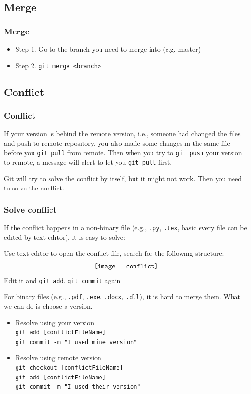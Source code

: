\documentclass{beamer}
\begin{document}
		\subsection{Merge}
			\begin{frame}
				\frametitle{Merge}
				\begin{itemize}
					\item Step 1. Go to the branch you need to merge into (e.g. master)
					\item Step 2. \texttt{git merge <branch>}
				\end{itemize}
			\end{frame}

		\subsection{Conflict}
			\begin{frame}
				\frametitle{Conflict}
				If your version is behind the remote version, i.e., someone had changed the files and push to remote repository, you also made some changes in the same file before you \texttt{git pull} from remote. Then when you try to \texttt{git push} your version to remote, a message will alert to let you \texttt{git pull} first.

				Git will try to solve the conflict by itself, but it might not work. Then you need to solve the conflict.
			\end{frame}

			\begin{frame}
				\frametitle{Solve conflict}
				If the conflict happens in a non-binary file (e.g., \texttt{.py}, \texttt{.tex}, basic every file can be edited by text editor), it is easy to solve:

				Use text editor to open the conflict file, search for the following structure:
				\begin{align}
					\centering
					\texttt{[image: conflict]} \nonumber
				\end{align}
				Edit it and \texttt{git add}, \texttt{git commit} again
			\end{frame}

			\begin{frame}
				For binary files (e.g., \texttt{.pdf}, \texttt{.exe}, \texttt{.docx}, \texttt{.dll}), it is hard to merge them. What we can do is choose a version.
				\begin{itemize}
					\item Resolve using your version\\
						\texttt{git add [conflictFileName]}\\
						\texttt{git commit -m "I used mine version"}
					\item Resolve using remote version\\
						\texttt{git checkout [conflictFileName]}\\
						\texttt{git add [conflictFileName]}\\
						\texttt{git commit -m "I used their version"}
				\end{itemize}
			\end{frame}
\end{document}
